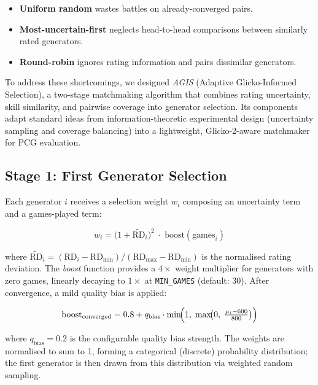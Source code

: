 \documentclass[shortabstract, mgr, english]{iithesis}
\begin{document}
\begin{itemize}
    \item \textbf{Uniform random} wastes battles on already-converged pairs.
    \item \textbf{Most-uncertain-first} neglects head-to-head comparisons between
          similarly rated generators.
    \item \textbf{Round-robin} ignores rating information and pairs dissimilar generators.
\end{itemize}

To address these shortcomings, we designed \emph{AGIS} (Adaptive Glicko-Informed
Selection), a two-stage matchmaking algorithm that combines rating
uncertainty, skill similarity, and pairwise coverage into generator selection.
Its components adapt standard ideas from information-theoretic
experimental design (uncertainty sampling and coverage balancing) into a lightweight, Glicko-2-aware matchmaker for PCG evaluation.

\subsection{Stage 1: First Generator Selection}
\label{subsec:sd-agis-stage1}

Each generator $i$ receives a selection weight $w_i$ composing an uncertainty term and
a games-played term:

\begin{equation}
\label{eq:agis-w1}
w_i = \bigl(1 + \widetilde{\text{RD}}_i\bigr)^2 \;\cdot\; \text{boost}(\text{games}_i)
\end{equation}

where $\widetilde{\text{RD}}_i = (\text{RD}_i - \text{RD}_{\min}) / (\text{RD}_{\max} -
\text{RD}_{\min})$ is the normalised rating deviation. The \emph{boost} function provides a $4\times$
weight multiplier for generators with zero games, linearly decaying to $1\times$ at
\texttt{MIN\_GAMES} (default: 30). After convergence, a mild quality bias is applied:

\begin{equation}
\text{boost}_{\text{converged}} = 0.8 + q_{\text{bias}} \cdot
\min\!\Bigl(1,\;\max\!\bigl(0,\;\tfrac{\mu_i - 600}{800}\bigr)\Bigr)
\end{equation}

where $q_{\text{bias}} = 0.2$ is the configurable quality bias strength. The weights
are normalised to sum to 1, forming a categorical (discrete) probability distribution;
the first generator is then drawn from this distribution via weighted random sampling.
\end{document}
